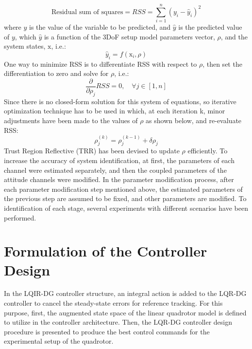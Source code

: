 \documentclass[3p,times]{elsarticle}
\begin{document}
\begin{equation}
    \text{Residual sum of squares} = RSS = \sum_{i=1}^{n} \left(y_i - \hat y_i \right)^2
\end{equation}
where $y$ is the value of the variable to be predicted, and $ \hat y$ is the predicted value of  $y$, which $\hat y$ is a function of the 3DoF setup model parameters vector, $\rho$,  and the system states, $\boldsymbol{{\mathrm{x}}}$, i.e.:
\begin{equation}
    \hat y_i = f(\boldsymbol{{\mathrm{x}}}_i, \rho)
\end{equation}
One way to minimize RSS is to differentiate RSS with respect to $\rho$, then set the differentiation to zero and solve for  $\rho$,  i.e.:
\begin{equation}
    \dfrac{\partial }{\partial \rho_j} RSS = 0, \quad \forall j \in [1, n]
\end{equation}
Since there is no closed-form solution for this system of equations, so iterative optimization technique has to be used in which, at each iteration k, minor adjustments have been made to the values of  $\rho$ as shown below, and re-evaluate RSS:
\begin{equation}
    \rho_j^{(k)} = \rho_j^{(k-1)} + \delta \rho_j
\end{equation}
Trust Region Reflective (TRR) has been devised to update $\rho$ efficiently. To increase the accuracy of system identification, at first, the parameters of each channel were estimated separately, and then the coupled parameters of the attitude channels were modified. In the parameter modification process, after each parameter modification step mentioned above, the estimated parameters of the previous step are assumed to be fixed, and other parameters are modified. To identification of each stage, several experiments with different scenarios have been performed.

\section{Formulation of the Controller Design}
\noindent In the LQIR-DG controller structure, an integral action is added to the LQR-DG controller to cancel the steady-state errors for reference tracking. For this purpose, first, the augmented state space of the linear quadrotor model is defined to utilize in the controller architecture. Then, the LQR-DG controller design procedure is presented to produce the best control commands for the experimental setup of the quadrotor.
\end{document}
